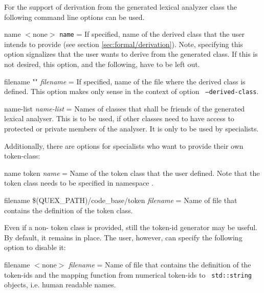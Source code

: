 For the support of derivation from the generated lexical analyzer class the
following command line options can be used.

\begin{description}
     {name} {$<$none$>$} 
        {
	    {\tt name} = If specified, name of the derived class that the user intends to provide
	    (see section \ref{sec:formal/derivation}). Note, specifying this option
	     signalizes that the user wants to derive from the generated class. If this
	     is not desired, this option, and the following, have to be left out.
        }        
        
     {filename} {""} 
        {
	    {\it filename} = If specified, name of the file where the derived class is
	    defined.  This option makes only sense in the context of option {\tt
		--derived-class}.
        }

     {name-list} {} 
        {
	    {\it name-list} = Names of classes that shall be friends of the
	    generated lexical analyser. This is to be used, if other classes 
		need to have access to protected or private members of the      
		analyser. It is only to be used by specialists.
	}
\end{description}


Additionally, there are options for specialists who want to provide their own
token-class:

\begin{description}

     {name} {token}
        {
	    {\it name} = Name of the token class that the user defined. Note that the 
	    token class needs to be specified in namespace {\quex}.
        }

     {filename} {\$(QUEX\_PATH)/code\_base/token}
        {
	    {\it filename} = Name of file that contains the definition of the
	    token class.
        }
\end{description}

Even if a non-{\quex} token class is provided, still the token-id generator may
be useful. By default, it remains in place. The user, however, can specify the
following option to disable it:

\begin{description}
     {filename} {$<$none$>$}
        {
	    {\it filename} = Name of file that contains the definition of the
	    token-ids and the mapping function from numerical token-ids to {\tt
	    std::string} objects, i.e. human readable names.
	}
\end{description}

